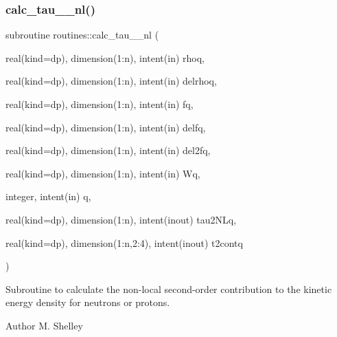 \subsubsection{\texorpdfstring{calc\+\_\+tau\+\_\+\_\+nl()}{calc\_tau\_2\_nl()}}
{\footnotesize\ttfamily subroutine routines\+::calc\+\_\+tau\+\_\+\_\+nl (\begin{DoxyParamCaption}\item[{real(kind=dp), dimension(1\+:n), intent(in)}]{rhoq,  }\item[{real(kind=dp), dimension(1\+:n), intent(in)}]{delrhoq,  }\item[{real(kind=dp), dimension(1\+:n), intent(in)}]{fq,  }\item[{real(kind=dp), dimension(1\+:n), intent(in)}]{delfq,  }\item[{real(kind=dp), dimension(1\+:n), intent(in)}]{del2fq,  }\item[{real(kind=dp), dimension(1\+:n), intent(in)}]{Wq,  }\item[{integer, intent(in)}]{q,  }\item[{real(kind=dp), dimension(1\+:n), intent(inout)}]{tau2\+N\+Lq,  }\item[{real(kind=dp), dimension(1\+:n,2\+:4), intent(inout)}]{t2contq }\end{DoxyParamCaption})}



Subroutine to calculate the non-\/local second-\/order contribution to the kinetic energy density for neutrons or protons. 

\begin{DoxyAuthor}{Author}
M. Shelley 
\end{DoxyAuthor}

